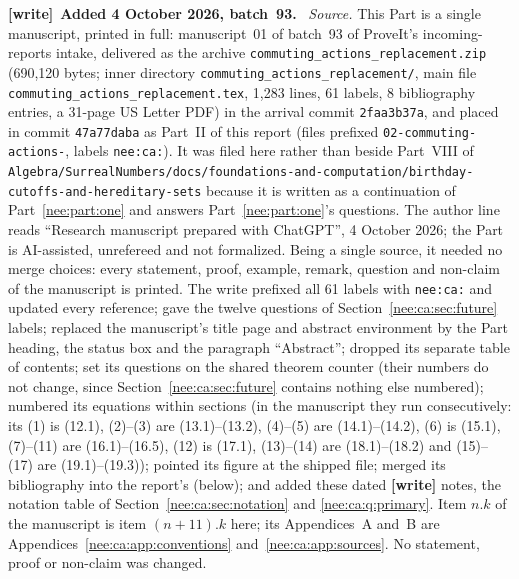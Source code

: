 \documentclass[11pt,letterpaper]{article}
\numberwithin{equation}{section}
\theoremstyle{plain}
\theoremstyle{definition}
\theoremstyle{remark}
\newenvironment{writenote}[1][]{\par\smallskip\begingroup\small\raggedright
 \setlength{\parindent}{1.25em}\noindent\textbf{[write]}\if\relax\detokenize{#1}\relax\else~\textbf{#1.}\fi\ }%
 {\par\endgroup\smallskip}
\begin{document}
\begin{writenote}[Added 4 October 2026, batch~93]
\emph{Source.} This Part is a single manuscript, printed in full: manuscript~01 of batch~93 of ProveIt's incoming-reports intake, delivered as the archive \texttt{commuting\_\allowbreak actions\_\allowbreak replacement.zip} (690,120 bytes; inner directory \texttt{commuting\_\allowbreak actions\_\allowbreak replacement/}, main file \texttt{commuting\_\allowbreak actions\_\allowbreak replacement.tex}, 1,283 lines, 61 labels, 8 bibliography entries, a 31-page US Letter PDF) in the arrival commit \texttt{2faa3b37a}, and placed in commit \texttt{47a77daba} as Part~II of this report (files prefixed \texttt{02-commuting-actions-}, labels \texttt{nee:ca:}). It was filed here rather than beside Part~VIII of \nolinkurl{Algebra/SurrealNumbers/docs/foundations-and-computation/birthday-cutoffs-and-hereditary-sets} because it is written as a continuation of Part~\ref{nee:part:one} and answers Part~\ref{nee:part:one}'s questions. The author line reads ``Research manuscript prepared with ChatGPT'', 4 October 2026; the Part is AI-assisted, unrefereed and not formalized. Being a single source, it needed no merge choices: every statement, proof, example, remark, question and non-claim of the manuscript is printed. The write prefixed all 61 labels with \texttt{nee:ca:} and updated every reference; gave the twelve questions of Section~\ref{nee:ca:sec:future} labels; replaced the manuscript's title page and abstract environment by the Part heading, the status box and the paragraph ``Abstract''; dropped its separate table of contents; set its questions on the shared theorem counter (their numbers do not change, since Section~\ref{nee:ca:sec:future} contains nothing else numbered); numbered its equations within sections (in the manuscript they run consecutively: its (1) is (12.1), (2)--(3) are (13.1)--(13.2), (4)--(5) are (14.1)--(14.2), (6) is (15.1), (7)--(11) are (16.1)--(16.5), (12) is (17.1), (13)--(14) are (18.1)--(18.2) and (15)--(17) are (19.1)--(19.3)); pointed its figure at the shipped file; merged its bibliography into the report's (below); and added these dated \textbf{[write]} notes, the notation table of Section~\ref{nee:ca:sec:notation} and \cref{nee:ca:q:primary}. Item $n.k$ of the manuscript is item $(n+11).k$ here; its Appendices~A and~B are Appendices~\ref{nee:ca:app:conventions} and~\ref{nee:ca:app:sources}. No statement, proof or non-claim was changed.


\end{writenote}
\end{document}
